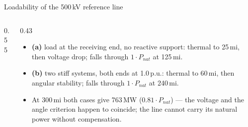 \begin{frame}{Loadability of the 500\,kV reference line}
  \begin{columns}[c,onlytextwidth]
    \begin{column}{0.55\textwidth}\centering
    \end{column}
    \begin{column}{0.43\textwidth}
      {\small
      \begin{itemize}
        \setlength{\itemsep}{0.35em}
        \item \textbf{(a)} load at the receiving end, no reactive support:
              thermal to 25\,mi, then voltage drop; falls through
              $1\cdot P_{nat}$ at 125\,mi.
        \item \textbf{(b)} two stiff systems, both ends at 1.0\,p.u.: thermal
              to 60\,mi, then angular stability; falls through
              $1\cdot P_{nat}$ at 240\,mi.
        \item At 300\,mi both cases give 763\,MW ($0.81\cdot P_{nat}$) ---
              the voltage and the angle criterion happen to coincide; the
              line cannot carry its natural power without compensation.
      \end{itemize}}
    \end{column}
  \end{columns}
\end{frame}


